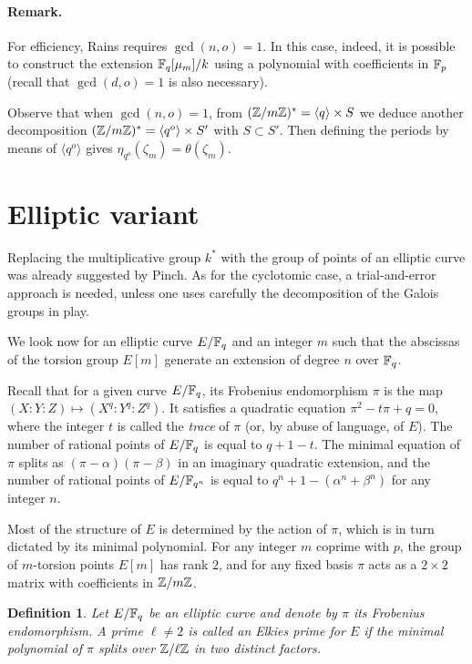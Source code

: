 \documentclass{article}
\newtheorem{Def}{Definition}
\begin{document}
\paragraph{Remark.} For efficiency, Rains requires $\gcd(n,o)=1$. In
this case, indeed, it is possible to construct the extension
$\mathbb{F}_q[\mu_m]/k$ using a polynomial with coefficients in $\mathbb{F}_p$ (recall
that $\gcd(d,o)=1$ is also necessary).

Observe that when $\gcd(n,o)=1$, from $(\mathbb{Z}/m\mathbb{Z})^\ast=\langle
q\rangle\times S$ we deduce another decomposition
$(\mathbb{Z}/m\mathbb{Z})^\ast=\langle q^o\rangle\times S'$ with $S\subset S'$. Then
defining the periods by means of $\langle q^o\rangle$ gives
$\eta_{q^o}(\zeta_m)=\theta(\zeta_m)$.


\section{Elliptic variant}

Replacing the multiplicative group $k^\ast$ with the group of points
of an elliptic curve was already suggested by Pinch. As for the
cyclotomic case, a trial-and-error approach is needed, unless one uses
carefully the decomposition of the Galois groups in play.

We look now for an elliptic curve $E/\mathbb{F}_q$ and an integer $m$ such
that the abscissas of the torsion group $E[m]$ generate an extension
of degree $n$ over $\mathbb{F}_q$.

Recall that for a given curve $E/\mathbb{F}_q$, its Frobenius endomorphism
$\pi$ is the map $(X:Y:Z)\mapsto(X^q:Y^q:Z^q)$. It satisfies a
quadratic equation $\pi^2-t\pi+q=0$, where the integer $t$ is called
the \emph{trace} of $\pi$ (or, by abuse of language, of $E$). The
number of rational points of $E/\mathbb{F}_q$ is equal to $q+1-t$. The minimal
equation of $\pi$ splits as $(\pi-\alpha)(\pi-\beta)$ in an imaginary
quadratic extension, and the number of rational points of $E/\mathbb{F}_{q^n}$
is equal to $q^n+1-(\alpha^n+\beta^n)$ for any integer $n$.

Most of the structure of $E$ is determined by the action of $\pi$,
which is in turn dictated by its minimal polynomial. For any integer
$m$ coprime with $p$, the group of $m$-torsion points $E[m]$ has rank
$2$, and for any fixed basis $\pi$ acts as a $2\times2$ matrix with
coefficients in $\mathbb{Z}/m\mathbb{Z}$.

\begin{Def}
  Let $E/\mathbb{F}_q$ be an elliptic curve and denote by $\pi$ its Frobenius
  endomorphism. A prime $\ell\ne2$ is called an \emph{Elkies prime}
  for $E$ if the minimal polynomial of $\pi$ splits over $\mathbb{Z}/\ell\mathbb{Z}$
  in two distinct factors.
\end{Def}
\end{document}
